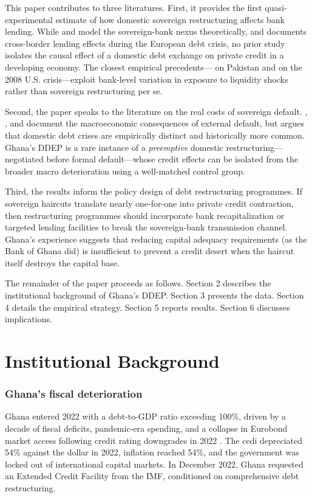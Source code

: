 \documentclass[12pt]{article}
\begin{document}
This paper contributes to three literatures. First, it provides the first quasi-experimental estimate of how domestic sovereign restructuring affects bank lending. While \citet{gennaioli2018sovereign} and \citet{bocola2016lending} model the sovereign-bank nexus theoretically, and \citet{popov2015exporting} documents cross-border lending effects during the European debt crisis, no prior study isolates the causal effect of a domestic debt exchange on private credit in a developing economy. The closest empirical precedents---\citet{khwaja2008} on Pakistan and \citet{chodorowreich2014} on the 2008 U.S. crisis---exploit bank-level variation in exposure to liquidity shocks rather than sovereign restructuring per se.

Second, the paper speaks to the literature on the real costs of sovereign default. \citet{arellano2008default}, \citet{mendoza2010sudden}, and \citet{reinhart2009aftermath} document the macroeconomic consequences of external default, but \citet{reinhart2011forgotten} argues that domestic debt crises are empirically distinct and historically more common. Ghana's DDEP is a rare instance of a \textit{preemptive} domestic restructuring---negotiated before formal default---whose credit effects can be isolated from the broader macro deterioration using a well-matched control group.

Third, the results inform the policy design of debt restructuring programmes. If sovereign haircuts translate nearly one-for-one into private credit contraction, then restructuring programmes should incorporate bank recapitalization or targeted lending facilities to break the sovereign-bank transmission channel. Ghana's experience suggests that reducing capital adequacy requirements (as the Bank of Ghana did) is insufficient to prevent a credit desert when the haircut itself destroys the capital base.

The remainder of the paper proceeds as follows. Section 2 describes the institutional background of Ghana's DDEP. Section 3 presents the data. Section 4 details the empirical strategy. Section 5 reports results. Section 6 discusses implications.

\section{Institutional Background}

\subsubsection*{Ghana's fiscal deterioration} Ghana entered 2022 with a debt-to-GDP ratio exceeding 100\%, driven by a decade of fiscal deficits, pandemic-era spending, and a collapse in Eurobond market access following credit rating downgrades in 2022 \citep{imf2023ghana}. The cedi depreciated 54\% against the dollar in 2022, inflation reached 54\%, and the government was locked out of international capital markets. In December 2022, Ghana requested an Extended Credit Facility from the IMF, conditioned on comprehensive debt restructuring.
\end{document}
